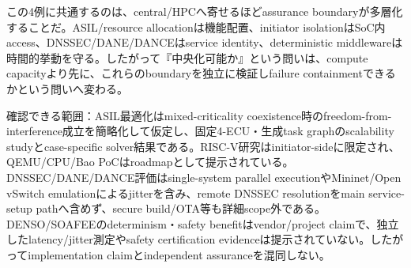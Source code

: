 \begin{surveyarticlebody}
この4例に共通するのは、central/HPCへ寄せるほどassurance boundaryが多層化することだ。ASIL/resource allocationは機能配置、initiator isolationはSoC内access、DNSSEC/DANE/DANCEはservice identity、deterministic middlewareは時間的挙動を守る。したがって『中央化可能か』という問いは、compute capacityより先に、これらのboundaryを独立に検証しfailure containmentできるかという問いへ変わる。\autocite{src-85ca0561a52b,src-eac8b3c725a2,src-f657aea94b5e,src-fe402f610af7}
\end{surveyarticlebody}

\begin{claimboundary}
確認できる範囲：ASIL最適化はmixed-criticality coexistence時のfreedom-from-interference成立を簡略化して仮定し、固定4-ECU・生成task graphのscalability studyとcase-specific solver結果である。RISC-V研究はinitiator-sideに限定され、QEMU/CPU/Bao PoCはroadmapとして提示されている。DNSSEC/DANE/DANCE評価はsingle-system parallel executionやMininet/Open vSwitch emulationによるjitterを含み、remote DNSSEC resolutionをmain service-setup pathへ含めず、secure build/OTA等も詳細scope外である。DENSO/SOAFEEのdeterminism・safety benefitはvendor/project claimで、独立したlatency/jitter測定やsafety certification evidenceは提示されていない。したがってimplementation claimとindependent assuranceを混同しない。\autocite{src-85ca0561a52b,src-eac8b3c725a2,src-f657aea94b5e,src-fe402f610af7}
\end{claimboundary}
